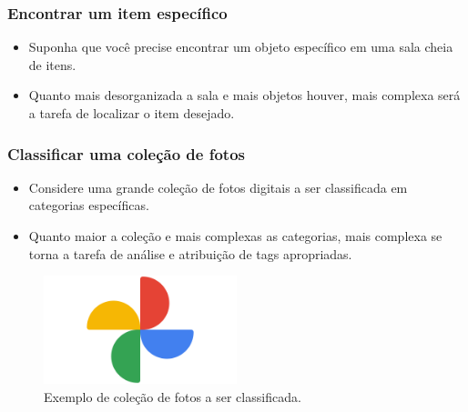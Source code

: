 \documentclass[12pt]{beamer}
\begin{document}
\begin{frame}
    \frametitle{Encontrar um item específico}
    \begin{itemize}\large
        \item Suponha que você precise encontrar um objeto específico em uma sala cheia de itens.
        \item Quanto mais desorganizada a sala e mais objetos houver, mais complexa será a tarefa de localizar o item desejado.
    \end{itemize}
\end{frame}

\begin{frame}
    \frametitle{Classificar uma coleção de fotos}

    \begin{itemize}
        \item Considere uma grande coleção de fotos digitais a ser classificada em categorias específicas.
        \item Quanto maior a coleção e mais complexas as categorias, mais complexa se torna a tarefa de análise e atribuição de tags apropriadas.
    \end{itemize}

    \begin{figure}[htb]
        \centering
        \includegraphics[width=0.5\textwidth]{fotos.jpg}
        \caption{Exemplo de coleção de fotos a ser classificada.}
        \label{fig:fotos}
    \end{figure}
\end{frame}
\end{document}
